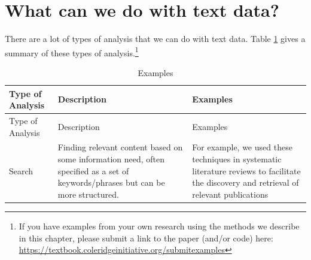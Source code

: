 \documentclass[]{krantz}
\begin{document}
\section{What can we do with text
data?}\label{what-can-we-do-with-text-data}

There are a lot of types of analysis that we can do with text data.
Table \ref{tab:table7-0} gives a summary of these types of
analysis.\footnote{If you have examples from your own research using the
  methods we describe in this chapter, please submit a link to the paper
  (and/or code) here:
  \url{https://textbook.coleridgeinitiative.org/submitexamples}}

\begin{longtable}[]{@{}lll@{}}
\caption{\label{tab:table7-0} Examples}\tabularnewline
\toprule
\begin{minipage}[b]{0.12\columnwidth}\raggedright\strut
Type of Analysis\strut
\end{minipage} & \begin{minipage}[b]{0.16\columnwidth}\raggedright\strut
Description\strut
\end{minipage} & \begin{minipage}[b]{0.63\columnwidth}\raggedright\strut
Examples\strut
\end{minipage}\tabularnewline
\midrule
\endfirsthead
\toprule
\begin{minipage}[b]{0.12\columnwidth}\raggedright\strut
Type of Analysis\strut
\end{minipage} & \begin{minipage}[b]{0.16\columnwidth}\raggedright\strut
Description\strut
\end{minipage} & \begin{minipage}[b]{0.63\columnwidth}\raggedright\strut
Examples\strut
\end{minipage}\tabularnewline
\midrule
\endhead
\begin{minipage}[t]{0.12\columnwidth}\raggedright\strut
Search\strut
\end{minipage} & \begin{minipage}[t]{0.16\columnwidth}\raggedright\strut
Finding relevant content based on some information need, often specified
as a set of keywords/phrases but can be more structured.\strut
\end{minipage} & \begin{minipage}[t]{0.63\columnwidth}\raggedright\strut
For example, we used these techniques in systematic literature reviews
to facilitate the discovery and retrieval of relevant publications

\end{minipage}
\end{longtable}
\end{document}
